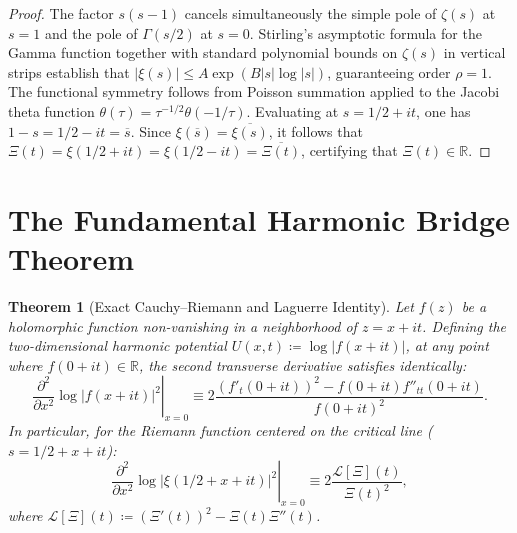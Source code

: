 \documentclass[11pt,a4paper]{article}
\newtheorem{theorem}{Theorem}[section]
\theoremstyle{definition}
\theoremstyle{remark}
\begin{document}
\begin{proof}
The factor $s(s-1)$ cancels simultaneously the simple pole of $\zeta(s)$ at $s=1$ and the pole of $\Gamma(s/2)$ at $s=0$. Stirling's asymptotic formula for the Gamma function together with standard polynomial bounds on $\zeta(s)$ in vertical strips establish that $|\xi(s)| \le A \exp(B |s| \log |s|)$, guaranteeing order $\rho = 1$. The functional symmetry follows from Poisson summation applied to the Jacobi theta function $\theta(\tau) = \tau^{-1/2}\theta(-1/\tau)$. Evaluating at $s = 1/2 + it$, one has $1 - s = 1/2 - it = \overline{s}$. Since $\xi(\overline{s}) = \overline{\xi(s)}$, it follows that $\Xi(t) = \xi(1/2 + it) = \xi(1/2 - it) = \overline{\Xi(t)}$, certifying that $\Xi(t) \in \mathbb{R}$.
\end{proof}

\section{The Fundamental Harmonic Bridge Theorem}

\begin{theorem}[Exact Cauchy--Riemann and Laguerre Identity]
\label{thm:puente_armonico_experto}
Let $f(z)$ be a holomorphic function non-vanishing in a neighborhood of $z = x + it$. Defining the two-dimensional harmonic potential $U(x, t) \coloneqq \log |f(x + it)|$, at any point where $f(0 + it) \in \mathbb{R}$, the second transverse derivative satisfies identically:
\begin{equation}
\left.\frac{\partial^2}{\partial x^2}\log |f(x + it)|^2\right|_{x=0} \equiv 2 \frac{(f'_t(0+it))^2 - f(0+it) f''_{tt}(0+it)}{f(0+it)^2}.
\end{equation}
In particular, for the Riemann function centered on the critical line ($s = 1/2 + x + it$):
\begin{equation}
\left.\frac{\partial^2}{\partial x^2}\log |\xi(1/2 + x + it)|^2\right|_{x=0} \equiv 2 \frac{\mathcal{L}[\Xi](t)}{\Xi(t)^2},
\end{equation}
where $\mathcal{L}[\Xi](t) \coloneqq (\Xi'(t))^2 - \Xi(t)\Xi''(t)$.
\end{theorem}
\end{document}
